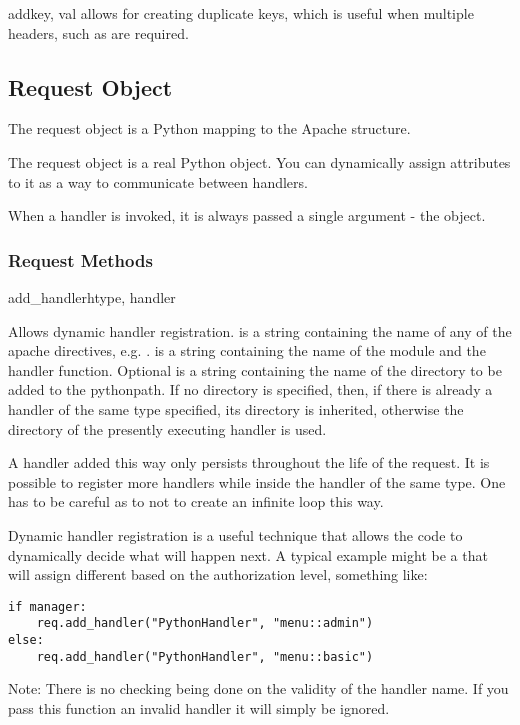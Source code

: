 \begin{methoddesc}[table]{add}{key, val}
 allows for creating duplicate keys, which is useful 
when multiple headers, such as  are required.
\end{methoddesc}

\subsection{Request Object\label{pyapi-mprequest}}

The request object is a Python mapping to the Apache
 structure. 

The request object is a real Python object. You can dynamically
assign attributes to it as a way to communicate between handlers.

When a handler is invoked, it is always passed a single argument - the
 object.

\subsubsection{Request Methods\label{pyapi-mprequest-meth}}

\begin{methoddesc}[request]{add_handler}{htype, handler}

Allows dynamic handler registration.  is a string
containing the name of any of the apache 
directives, e.g. .  is a string
containing the name of the module and the handler function.  Optional
 is a string containing the name of the directory to be added
to the pythonpath. If no directory is specified, then, if there is
already a handler of the same type specified, its directory is
inherited, otherwise the directory of the presently executing handler
is used.
                  
A handler added this way only persists throughout the life of the
request. It is possible to register more handlers while inside the
handler of the same type. One has to be careful as to not to create an
infinite loop this way.

Dynamic handler registration is a useful technique that allows the
code to dynamically decide what will happen next. A typical example
might be a  that will assign different
 based on the authorization level, something like:

\begin{verbatim}
if manager:
    req.add_handler("PythonHandler", "menu::admin")
else:
    req.add_handler("PythonHandler", "menu::basic")
\end{verbatim}                              

Note: There is no checking being done on the validity of the handler
name. If you pass this function an invalid handler it will simply be
ignored.
\end{methoddesc}

